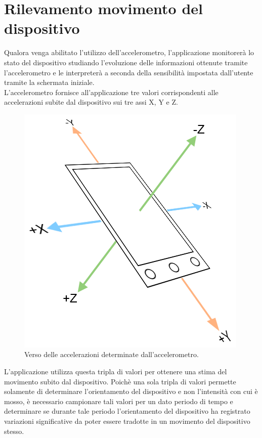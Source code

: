 \section{Rilevamento movimento del dispositivo}
Qualora venga abilitato l'utilizzo dell'accelerometro, l'applicazione monitorerà lo stato del dispositivo studiando l'evoluzione delle informazioni ottenute tramite l'accelerometro e le interpreterà a seconda della sensibilità impostata dall'utente tramite la schermata iniziale.\\

L'accelerometro fornisce all'applicazione tre valori corrispondenti alle accelerazioni subite dal dispositivo sui tre assi X, Y e Z.
\begin{figure}[!ht]
\begin{center}
\includegraphics[scale=.5]{./../wireless/resources/accelerometer.png}
\caption{Verso delle accelerazioni determinate dall'accelerometro.}
\label{fig:Accelerometro}
\end{center}
\end{figure}
L'applicazione utilizza questa tripla di valori per ottenere una stima del movimento subito dal dispositivo. Poichè una sola tripla di valori permette solamente di determinare l'orientamento del dispositivo e non l'intensità con cui è mosso, è necessario campionare tali valori per un dato periodo di tempo e determinare se durante tale periodo l'orientamento del dispositivo ha registrato variazioni significative da poter essere tradotte in un movimento del dispositivo stesso.\\
